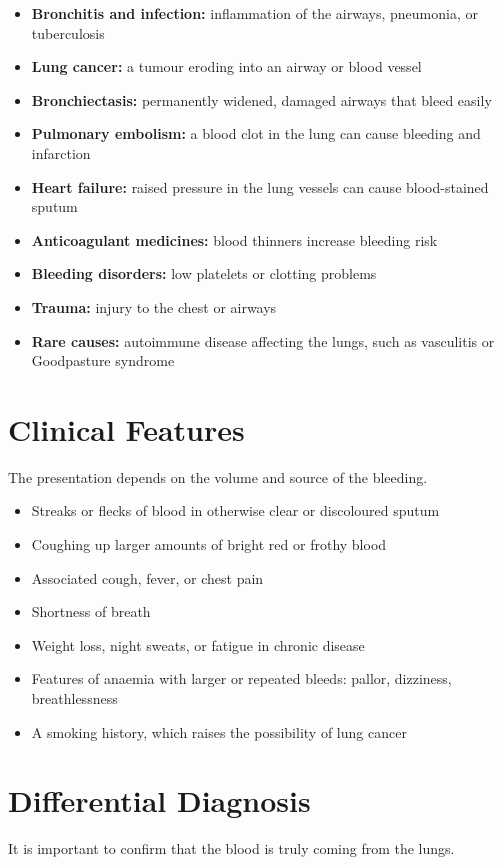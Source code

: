 \begin{itemize}
    \item \textbf{Bronchitis and infection:} inflammation of the airways, pneumonia, or tuberculosis
    \item \textbf{Lung cancer:} a tumour eroding into an airway or blood vessel
    \item \textbf{Bronchiectasis:} permanently widened, damaged airways that bleed easily
    \item \textbf{Pulmonary embolism:} a blood clot in the lung can cause bleeding and infarction
    \item \textbf{Heart failure:} raised pressure in the lung vessels can cause blood-stained sputum
    \item \textbf{Anticoagulant medicines:} blood thinners increase bleeding risk
    \item \textbf{Bleeding disorders:} low platelets or clotting problems
    \item \textbf{Trauma:} injury to the chest or airways
    \item \textbf{Rare causes:} autoimmune disease affecting the lungs, such as vasculitis or Goodpasture syndrome
\end{itemize}

\section*{Clinical Features}
The presentation depends on the volume and source of the bleeding.

\begin{itemize}
    \item Streaks or flecks of blood in otherwise clear or discoloured sputum
    \item Coughing up larger amounts of bright red or frothy blood
    \item Associated cough, fever, or chest pain
    \item Shortness of breath
    \item Weight loss, night sweats, or fatigue in chronic disease
    \item Features of anaemia with larger or repeated bleeds: pallor, dizziness, breathlessness
    \item A smoking history, which raises the possibility of lung cancer
\end{itemize}

\section*{Differential Diagnosis}
It is important to confirm that the blood is truly coming from the lungs.

